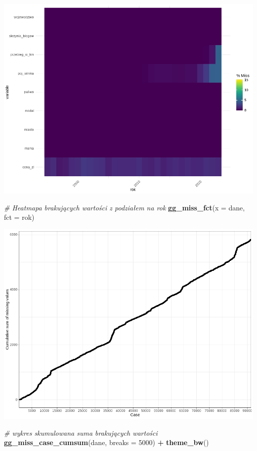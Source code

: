 \documentclass[
]{article}
\newenvironment{Shaded}{\begin{snugshade}}{\end{snugshade}}
\newcommand{\AttributeTok}[1]{\textcolor[rgb]{0.13,0.29,0.53}{#1}}
\newcommand{\CommentTok}[1]{\textcolor[rgb]{0.56,0.35,0.01}{\textit{#1}}}
\newcommand{\DecValTok}[1]{\textcolor[rgb]{0.00,0.00,0.81}{#1}}
\newcommand{\FunctionTok}[1]{\textcolor[rgb]{0.13,0.29,0.53}{\textbf{#1}}}
\newcommand{\NormalTok}[1]{#1}
\newcommand{\SpecialCharTok}[1]{\textcolor[rgb]{0.81,0.36,0.00}{\textbf{#1}}}
\begin{document}
\includegraphics[width=1\linewidth]{images/10}

\begin{Shaded}
\begin{Highlighting}[]
\CommentTok{\# Heatmapa brakujących wartości z podziałem na rok}
\FunctionTok{gg\_miss\_fct}\NormalTok{(}\AttributeTok{x =}\NormalTok{ dane, }\AttributeTok{fct =}\NormalTok{ rok)}
\end{Highlighting}
\end{Shaded}

\includegraphics[width=1\linewidth]{images/11}

\begin{Shaded}
\begin{Highlighting}[]
\CommentTok{\# wykres skumulowana suma brakujących wartości}
\FunctionTok{gg\_miss\_case\_cumsum}\NormalTok{(dane, }\AttributeTok{breaks =} \DecValTok{5000}\NormalTok{) }\SpecialCharTok{+} \FunctionTok{theme\_bw}\NormalTok{()}
\end{Highlighting}
\end{Shaded}
\end{document}
